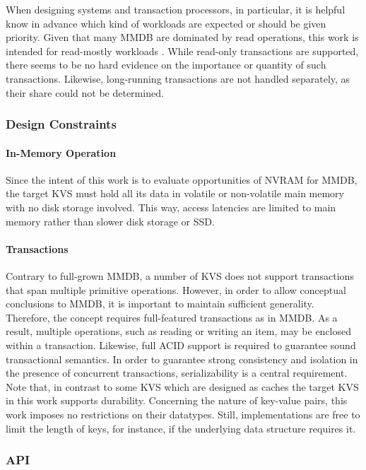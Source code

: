 When designing systems and transaction processors, in particular, it is helpful
know in advance which kind of workloads are expected or should be given
priority. Given that many MMDB are dominated by read operations, this work is
intended for read-mostly workloads \cite{andrei2017sap}. While read-only
transactions are supported, there seems to be no hard evidence on the importance
or quantity of such transactions. Likewise, long-running transactions are not
handled separately, as their share could not be determined.

\subsubsection{Design Constraints}

\paragraph{In-Memory Operation}

Since the intent of this work is to evaluate opportunities of NVRAM for MMDB,
the target KVS must hold all its data in volatile or non-volatile main memory
with no disk storage involved. This way, access latencies are limited to main
memory rather than slower disk storage or SSD.

\paragraph{Transactions}

Contrary to full-grown MMDB, a number of KVS does not support transactions that
span multiple primitive operations. However, in order to allow conceptual
conclusions to MMDB, it is important to maintain sufficient generality.
Therefore, the concept requires full-featured transactions as in MMDB. As a
result, multiple operations, such as reading or writing an item, may be enclosed
within a transaction. Likewise, full ACID support is required to guarantee sound
transactional semantics. In order to guarantee strong consistency and isolation
in the presence of concurrent transactions, serializability is a central
requirement. Note that, in contrast to some KVS which are designed as caches the
target KVS in this work supports durability. Concerning the nature of key-value
pairs, this work imposes no restrictions on their datatypes. Still,
implementations are free to limit the length of keys, for instance, if the
underlying data structure requires it.

\subsubsection{API}

